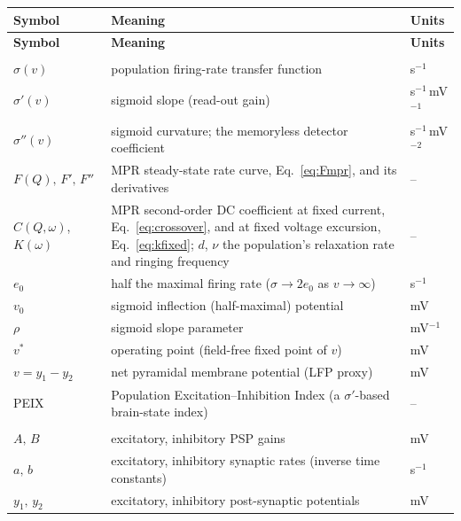 \documentclass[11pt,a4paper]{article}
\newcommand{\Sig}{\sigma}
\providecommand{\DIFaddbegin}{} %
\providecommand{\DIFaddend}{} %
\providecommand{\DIFdelbegin}{} %
\providecommand{\DIFdelend}{} %
\begin{document}
\renewcommand{\arraystretch}{1.18}
{\footnotesize
\DIFdelbegin %
\DIFdelend \DIFaddbegin \begin{longtable}{@{}>{\raggedright\arraybackslash}p{} >{\raggedright\arraybackslash}p{} >{\raggedright\arraybackslash}p{}@{}}
\DIFaddend \toprule
\textbf{Symbol} & \textbf{Meaning} & \textbf{Units} \\
\midrule
\endfirsthead
\toprule
\textbf{Symbol} & \textbf{Meaning} & \textbf{Units} \\
\midrule
\endhead
\midrule \multicolumn{3}{@{}l}{\textit{Firing-rate nonlinearity (sigmoid)}} \\*
$\Sig(v)$ & population firing-rate transfer function & s$^{-1}$ \\
$\Sig'(v)$ & sigmoid slope (read-out gain) & s$^{-1}$\,mV$^{-1}$ \\
$\Sig''(v)$ & sigmoid curvature; the memoryless detector coefficient & s$^{-1}$\,mV$^{-2}$ \\
$F(Q),\,F',\,F''$ & MPR steady-state rate curve, Eq.~\eqref{eq:Fmpr}, and its derivatives & -- \\
$C(Q,\omega)$, $K(\omega)$ & MPR second-order DC coefficient at fixed current, Eq.~\eqref{eq:crossover}, and at fixed voltage excursion, Eq.~\eqref{eq:kfixed}; $d$, $\nu$ the population's relaxation rate and ringing frequency & -- \\
$e_0$ & half the maximal firing rate ($\Sig\!\to\!2e_0$ as $v\!\to\!\infty$) & s$^{-1}$ \\
$v_0$ & sigmoid inflection (half-maximal) potential & mV \\
$\rho$ & sigmoid slope parameter & mV$^{-1}$ \\
$v^{*}$ & operating point (field-free fixed point of $v$) & mV \\
$v=y_1-y_2$ & net pyramidal membrane potential (LFP proxy) & mV \\
PEIX & Population Excitation--Inhibition Index (a $\Sig'$-based brain-state index) & -- \\
\midrule \multicolumn{3}{@{}l}{\textit{Single-column Jansen--Rit}} \\*
$A,\,B$ & excitatory, inhibitory PSP gains & mV \\
$a,\,b$ & excitatory, inhibitory synaptic rates (inverse time constants) & s$^{-1}$ \\
$y_1,\,y_2$ & excitatory, inhibitory post-synaptic potentials & mV \\

\end{longtable}}
\end{document}
